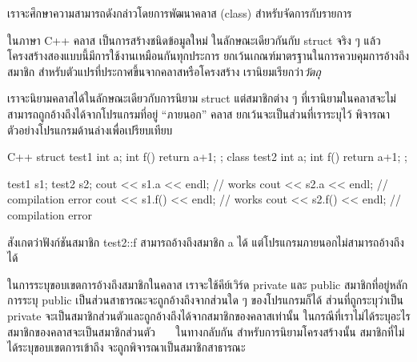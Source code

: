 เรา{\wbr}จะ{\wbr}ศึกษา{\wbr}ความ{\wbr}สามารถ{\wbr}ดังกล่าว{\wbr}โดย{\wbr}การ{\wbr}พัฒนา{\wbr}ค{\wbr}ลา{\wbr}ส ({\ct class})
สำหรับ{\wbr}จัดการ{\wbr}กับ{\wbr}รายการ  

ใน{\wbr}ภาษา C++ ค{\wbr}ลา{\wbr}ส เป็น{\wbr}การ{\wbr}สร้าง{\wbr}ชนิด{\wbr}ข้อมูล{\wbr}ใหม่ ใน{\wbr}ลักษณะ{\wbr}เดียวกัน{\wbr}กับ {\ct struct} จริง{\wbr}
ๆ แล้ว โครงสร้าง{\wbr}สอง{\wbr}แบบ{\wbr}นี้{\wbr}มี{\wbr}การ{\wbr}ใช้{\wbr}งาน{\wbr}เหมือน{\wbr}กัน{\wbr}ทุก{\wbr}ประการ{\wbr}
ยกเว้น{\wbr}เกณฑ์{\wbr}มาตรฐาน{\wbr}ใน{\wbr}การ{\wbr}ควบคุม{\wbr}การ{\wbr}อ้าง{\wbr}ถึง{\wbr}สมาชิก{\wbr}
สำหรับ{\wbr}ตัวแปร{\wbr}ที่{\wbr}ประกาศ{\wbr}ขึ้น{\wbr}จาก{\wbr}ค{\wbr}ลา{\wbr}ส{\wbr}หรือ{\wbr}โครงสร้าง เรา{\wbr}นิยม{\wbr}เรียก{\wbr}ว่า{\em วัตถุ}

เรา{\wbr}จะ{\wbr}นิยาม{\wbr}ค{\wbr}ลา{\wbr}ส{\wbr}ได้{\wbr}ใน{\wbr}ลักษณะ{\wbr}เดียวกับ{\wbr}การ{\wbr}นิยาม {\ct struct} แต่{\wbr}สมาชิก{\wbr}ต่าง ๆ
ที่{\wbr}เรา{\wbr}นิยาม{\wbr}ใน{\wbr}ค{\wbr}ลา{\wbr}ส{\wbr}จะ{\wbr}ไม่{\wbr}สามารถ{\wbr}ถูก{\wbr}อ้าง{\wbr}ถึง{\wbr}ได้{\wbr}จาก{\wbr}โปรแกรม{\wbr}ที่อยู่ ``ภายนอก'' ค{\wbr}ลา{\wbr}ส
ยกเว้น{\wbr}จะ{\wbr}เป็น{\wbr}ส่วน{\wbr}ที่{\wbr}เรา{\wbr}ระบุ{\wbr}ไว้ พิจารณา{\wbr}ตัวอย่าง{\wbr}โปรแกรม{\wbr}ด้าน{\wbr}ล่าง{\wbr}เพื่อ{\wbr}เปรียบเทียบ{\wbr}

\latintext
\begin{codelist}{C++}{}
struct test1 { int a;  int f() { return a+1; } };
class test2 { int a; int f() { return a+1; } };

test1 s1;  test2 s2;
cout << s1.a << endl;       // works
cout << s2.a << endl;       // compilation error
cout << s1.f() << endl;     // works
cout << s2.f() << endl;     // compilation error
\end{codelist}
\thaitext

สังเกต{\wbr}ว่า{\wbr}ฟังก์ชัน{\wbr}สมาชิก {\ct test2::f } สามารถ{\wbr}อ้าง{\wbr}ถึง{\wbr}สมาชิก {\ct a} ได้{\wbr}
แต่{\wbr}โปรแกรม{\wbr}ภายนอก{\wbr}ไม่{\wbr}สามารถ{\wbr}อ้าง{\wbr}ถึง{\wbr}ได้{\wbr}

ใน{\wbr}การ{\wbr}ระบุ{\wbr}ขอบเขต{\wbr}การ{\wbr}อ้าง{\wbr}ถึง{\wbr}สมาชิก{\wbr}ใน{\wbr}ค{\wbr}ลา{\wbr}ส เรา{\wbr}จะ{\wbr}ใช้{\wbr}คีย์{\wbr}เวิร์ด {\ct private} และ {\ct
  public} สมาชิก{\wbr}ที่อยู่{\wbr}หลักการ{\wbr}ระบุ {\ct public}
เป็น{\wbr}ส่วน{\wbr}สาธารณะ{\wbr}จะ{\wbr}ถูก{\wbr}อ้าง{\wbr}ถึง{\wbr}จาก{\wbr}ส่วน{\wbr}ใด ๆ ของ{\wbr}โปรแกรม{\wbr}ก็ได้ ส่วน{\wbr}ที่{\wbr}ถูก{\wbr}ระบุ{\wbr}ว่า{\wbr}เป็น {\ct
  private} จะ{\wbr}เป็น{\wbr}สมาชิก{\wbr}ส่วนตัว{\wbr}และ{\wbr}ถูก{\wbr}อ้าง{\wbr}ถึง{\wbr}ได้{\wbr}จาก{\wbr}สมาชิก{\wbr}ของ{\wbr}ค{\wbr}ลา{\wbr}ส{\wbr}เท่านั้น{\wbr}
ใน{\wbr}กรณี{\wbr}ที่{\wbr}เรา{\wbr}ไม่{\wbr}ได้{\wbr}ระบุ{\wbr}อะไร สมาชิก{\wbr}ของ{\wbr}ค{\wbr}ลา{\wbr}ส{\wbr}จะ{\wbr}เป็น{\wbr}สมาชิก{\wbr}ส่วนตัว \ \ \ ใน{\wbr}ทาง{\wbr}กลับ{\wbr}กัน{\wbr}
สำหรับ{\wbr}การ{\wbr}นิยาม{\wbr}โครงสร้าง{\wbr}นั้น สมาชิก{\wbr}ที่{\wbr}ไม่{\wbr}ได้{\wbr}ระบุ{\wbr}ขอบเขต{\wbr}การ{\wbr}เข้าถึง{\wbr}
จะ{\wbr}ถูก{\wbr}พิจารณา{\wbr}เป็น{\wbr}สมาชิก{\wbr}สาธารณะ{\wbr}


